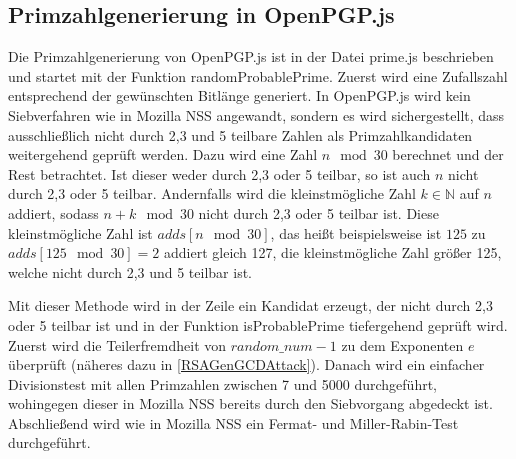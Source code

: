 \subsection{Primzahlgenerierung in OpenPGP.js}

Die Primzahlgenerierung von OpenPGP.js ist in der Datei prime.js beschrieben und startet mit der Funktion randomProbablePrime.
Zuerst wird eine Zufallszahl entsprechend der gewünschten Bitlänge generiert.
In OpenPGP.js wird kein Siebverfahren wie in Mozilla NSS angewandt, sondern es wird sichergestellt, dass ausschließlich nicht durch 2,3 und 5 teilbare Zahlen als Primzahlkandidaten weitergehend geprüft werden.
Dazu wird eine Zahl $n \mod 30$ berechnet und der Rest betrachtet.
Ist dieser weder durch 2,3 oder 5 teilbar, so ist auch $n$ nicht durch 2,3 oder 5 teilbar.
Andernfalls wird die kleinstmögliche Zahl $k \in \mathbb{N}$ auf $n$ addiert, sodass $n + k \mod 30$ nicht durch 2,3 oder 5 teilbar ist.
Diese kleinstmögliche Zahl ist $adds[n \mod 30]$, das heißt beispielsweise ist $125$ zu $adds[125 \mod 30] = 2$ addiert gleich 127, die kleinstmögliche Zahl größer 125, welche nicht durch 2,3 und 5 teilbar ist.

Mit dieser Methode wird in der Zeile ein Kandidat erzeugt, der nicht durch 2,3 oder 5 teilbar ist und in der Funktion isProbablePrime tiefergehend geprüft wird.
Zuerst wird die Teilerfremdheit von $random\_num -1$ zu dem Exponenten $e$ überprüft (näheres dazu in \ref{RSAGenGCDAttack}).
Danach wird ein einfacher Divisionstest mit allen Primzahlen zwischen 7 und 5000 durchgeführt, wohingegen dieser in Mozilla NSS bereits durch den Siebvorgang abgedeckt ist.
Abschließend wird wie in Mozilla NSS ein Fermat- und Miller-Rabin-Test durchgeführt.


